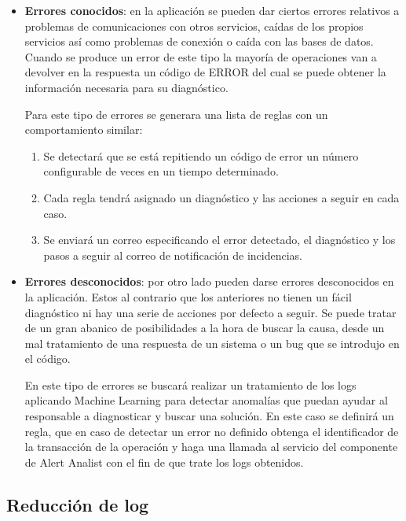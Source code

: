 \begin{itemize}
    \item \textbf{Errores conocidos}: en la aplicación se pueden dar ciertos errores relativos a problemas de comunicaciones con otros servicios, caídas de los propios servicios así como problemas de conexión o caída con las bases de datos. Cuando se produce un error de este tipo la mayoría de operaciones van a devolver en la respuesta un código de ERROR del cual se puede obtener la información necesaria para su diagnóstico.
    
    Para este tipo de errores se generara una lista de reglas con un comportamiento similar:
    \begin{enumerate}
        \item Se detectará que se está repitiendo un código de error un número configurable de veces en un tiempo determinado.
        \item Cada regla tendrá asignado un diagnóstico y las acciones a seguir en cada caso.
        \item Se enviará un correo especificando el error detectado, el diagnóstico y los pasos a seguir al correo de notificación de incidencias.
    \end{enumerate}
    
    \item \textbf{Errores desconocidos}: por otro lado pueden darse errores desconocidos en la aplicación. Estos al contrario que los anteriores no tienen un fácil diagnóstico ni hay una serie de acciones por defecto a seguir. Se puede tratar de un gran abanico de posibilidades a la hora de buscar la causa, desde un mal tratamiento de una respuesta de un sistema o un bug que se introdujo en el código. 
    
    En este tipo de errores se buscará realizar un tratamiento de los logs aplicando Machine Learning para detectar anomalías que puedan ayudar al responsable a diagnosticar y buscar una solución. En este caso se definirá un regla, que en caso de detectar un error no definido obtenga el identificador de la transacción de la operación y haga una llamada al servicio del componente de Alert Analist con el fin de que trate los logs obtenidos.
    
\end{itemize}


\subsection{Reducción de log}

